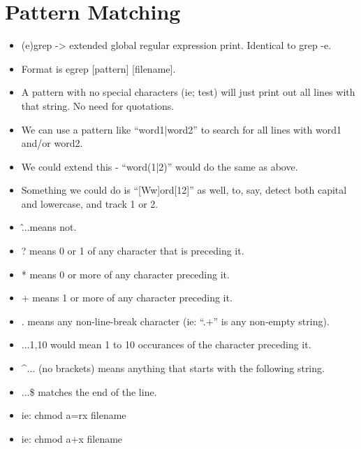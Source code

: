 \documentclass{article}
\begin{document}
\section{Pattern Matching}
\begin{itemize}
		
\item (e)grep -> extended global regular expression print.  Identical to grep -e.
\item Format is egrep [pattern] [filename].
\item A pattern with no special characters (ie; test) will just print out all lines with that string.  No need for quotations.
\item We can use a pattern like “word1|word2” to search for all lines with word1 and/or word2.
\item We could extend this - “word(1|2)” would do the same as above.
\item Something we could do is “[Ww]ord[12]” as well, to, say, detect both capital and lowercase, and track 1 or 2.
\item \lbrack \^...\rbrack means not.
\item ? means 0 or 1 of any character that is preceding it.
\item * means 0 or more of any character preceding it.
\item + means 1 or more of any character preceding it.
\item . means any non-line-break character (ie: “.+” is any non-empty string).
\item ...{1,10} would mean 1 to 10 occurances of the character preceding it.
\item \^{}... (no brackets) means anything that starts with the following string.
\item ...\$ matches the end of the line.
\item ie: chmod a=rx filename
\item ie: chmod a+x filename

\end{itemize}
\end{document}
